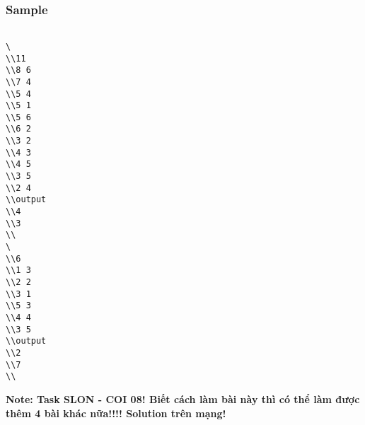 \subsubsection{   Sample  }
\begin{verbatim}

\ 
\\11 
\\8 6 
\\7 4 
\\5 4 
\\5 1 
\\5 6 
\\6 2 
\\3 2 
\\4 3 
\\4 5 
\\3 5 
\\2 4 
\\output 
\\4 
\\3 
\\
\ 
\\6 
\\1 3 
\\2 2 
\\3 1 
\\5 3 
\\4 4 
\\3 5 
\\output 
\\2 
\\7 
\\\end{verbatim}

\textbf{    Note: Task SLON - COI 08! Biết cách làm bài này thì có thể làm được thêm 4 bài khác nữa!!!! Solution trên mạng!   }
